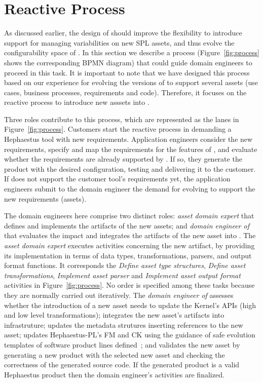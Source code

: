 \section{Reactive Process}
\label{sec:process}

As discussed earlier, the design of \hpl{} should improve the flexibility to introduce 
support for managing variabilities on new SPL assets, and thus evolve the configurability 
space of \hpl{}. In this section we describe a process (Figure~\ref{fig:process} shows the corresponding BPMN diagram) that could guide domain engineers to proceed in this task. 
It is important to note that we have designed this process based on our experience for 
evolving the versions of \hpl{} to support several assets (use cases, business processes, requirements and code). Therefore, it focuses on the reactive process to introduce new asssets into \hpl. 

Three roles contribute to this process, which are represented as the lanes in Figure~\ref{fig:process}. Customers start the reactive 
process in \hpl{} demanding a Hephaestus tool with new requirements. Application engineers consider the new requirements,
specify and map the requirements for the features of \hpl{}, and evaluate whether the requirements are 
already supported by \hpl. If so, they generate the \hpl{} product with the desired configuration, 
testing and delivering it to the customer. If \hpl{} does not support the customer tool's requirements yet, the application 
engineers submit to the domain engineer the demand for evolving \hpl{} to support the new requirements (assets).

The domain engineers here comprise two distinct roles: \emph{asset domain expert} that defines and 
implements the artifacts of the new assets; and \emph{domain engineer of \hpl{}} that evaluates the impact and integrates the artifacts 
of the new asset into \hpl. The \emph{asset domain expert} executes activities concerning the new artifact, by providing its implementation in terms of data types, transformations, parsers, and output format functions. It corresponds the 
\textit{Define asset type structures}, \textit{Define asset transformations}, \textit{Implement asset parser} and \textit{Implement asset output format} activities in Figure~\ref{fig:process}.
No order is specified among these tasks because they are normally 
carried out iteratively. The \textit{domain engineer of \hpl{}} assesses whether the introduction of a new asset needs to update the \hpl{} 
Kernel's APIs (high and low level transformations); integrates the new asset's artifacts into \hpl{} infrastruture; updates the metadata strutures inserting references to the new 
asset; updates Hephaestus-PL's FM and CK using the guidance of safe evolution templates of software product 
lines defined~\cite{gpce11}; and validates the new asset by generating a new \hpl{} product with the selected new asset and checking 
the correctness of the generated source code. If the generated product is a valid Hephaestus product 
then the domain engineer's activities are finalized.

